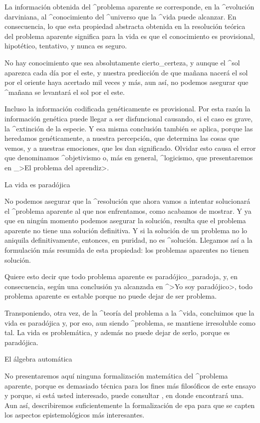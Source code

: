La información obtenida del ^{problema aparente} se corresponde, en la
^{evolución} darviniana, al ^{conocimiento} del ^{universo} que la
^{vida} puede alcanzar. En consecuencia, lo que esta propiedad abstracta
obtenida en la resolución teórica del problema aparente significa para
la vida es que el conocimiento es provisional, hipotético, tentativo, y
nunca es seguro.

No hay conocimiento que sea absolutamente cierto_{certeza}, y aunque el
^{sol} aparezca cada día por el este, y nuestra predicción de que mañana
nacerá el sol por el oriente haya acertado mil veces y más, aun así, no
podemos asegurar que ^{mañana} se levantará el sol por el este.

Incluso la información codificada genéticamente es provisional. Por esta
razón la información genética puede llegar a ser disfuncional causando,
si el caso es grave, la ^{extinción} de la especie. Y esa misma
conclusión también se aplica, porque las heredamos genéticamente, a
nuestra percepción, que determina las cosas que vemos, y a nuestras
emociones, que les dan significado. Olvidar esto causa el error que
denominamos ^{objetivismo} o, más en general, ^{logicismo}, que
presentaremos en _>El problema del aprendiz>.


\Section La vida es paradójica

No podemos asegurar que la ^{resolución} que ahora vamos a intentar
solucionará el ^{problema aparente} al que nos enfrentamos, como
acabamos de mostrar. Y ya que en ningún momento podemos asegurar la
solución, resulta que el problema aparente no tiene una solución
definitiva. Y si la solución de un problema no lo aniquila
definitivamente, entonces, en puridad, no es ^{solución}. Llegamos así a
la formulación más resumida de esta propiedad: los problemas aparentes
no tienen solución.

Quiere esto decir que todo problema aparente es paradójico_{paradoja}, y,
en consecuencia, según una conclusión ya alcanzada en ^>Yo soy
paradójico>, todo problema aparente es estable porque no puede dejar de
ser problema.

Transponiendo, otra vez, de la ^{teoría del problema} a la ^{vida},
concluimos que la vida es paradójica y, por eso, aun siendo ^{problema},
se mantiene irresoluble como tal. La vida es problemática, y además no
puede dejar de serlo, porque es paradójica.


\Section El álgebra automática

No presentaremos aquí ninguna formalización matemática del ^{problema
aparente}, porque es demasiado técnica para los fines más filosóficos de
este ensayo y porque, si está usted interesado, puede consultar
, en donde encontrará una. Aun así, describiremos
suficientemente la formalización de {\sc epa} para que se capten los
aspectos epistemológicos más interesantes.

